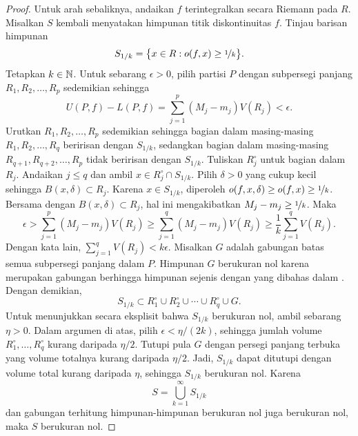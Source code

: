 \begin{proof}
\pagebreak[2]
Untuk arah sebaliknya, andaikan $f$ terintegralkan secara Riemann
pada $R$.
Misalkan $S$ kembali menyatakan himpunan titik diskontinuitas $f$. Tinjau
barisan himpunan
\begin{equation*}
S_{1/k} = \bigl\{ x \in R : o(f,x) \geq \nicefrac{1}{k} \bigr\}.
\end{equation*}
Tetapkan $k \in {\mathbb{N}}$.
Untuk sebarang $\epsilon > 0$, pilih partisi $P$ dengan subpersegi panjang
$R_1,R_2,\ldots,R_p$ sedemikian sehingga
\begin{equation*}
U(P,f)-L(P,f) =
\sum_{j=1}^p (M_j-m_j) V(R_j)
< \epsilon .
\end{equation*}
Urutkan $R_1,R_2,\ldots,R_p$ sedemikian sehingga bagian dalam masing-masing
$R_1,R_2,\ldots,R_{q}$ beririsan dengan $S_{1/k}$, sedangkan bagian dalam
masing-masing $R_{q+1},R_{q+2},\ldots,R_p$ tidak beririsan dengan $S_{1/k}$.
Tuliskan $R_j^\circ$ untuk bagian dalam $R_j$.
Andaikan $j \leq q$ dan ambil
$x \in R_j^\circ \cap S_{1/k}$.
Pilih $\delta > 0$ yang cukup kecil sehingga $B(x,\delta) \subset R_j$.
Karena $x \in S_{1/k}$, diperoleh
$o(f,x,\delta) \geq o(f,x) \geq \nicefrac{1}{k}$.
Bersama dengan $B(x,\delta) \subset R_j$, hal ini mengakibatkan
$M_j-m_j \geq \nicefrac{1}{k}$.
Maka
\begin{equation*}
\epsilon >
\sum_{j=1}^p (M_j-m_j) V(R_j)
\geq
\sum_{j=1}^q (M_j-m_j) V(R_j)
\geq
\frac{1}{k}
\sum_{j=1}^q V(R_j) .
\end{equation*}
Dengan kata lain,
$\sum_{j=1}^q V(R_j) < k \epsilon$.
Misalkan $G$ adalah gabungan batas semua subpersegi panjang dalam $P$.
Himpunan $G$ berukuran nol karena merupakan gabungan berhingga himpunan sejenis
dengan yang dibahas dalam .
Dengan demikian,
\begin{equation*}
S_{1/k} \subset R_1^\circ \cup R_2^\circ \cup \cdots \cup R_q^\circ \cup G .
\end{equation*}
Untuk menunjukkan secara eksplisit bahwa $S_{1/k}$ berukuran nol, ambil
sebarang $\eta>0$. Dalam argumen di atas, pilih
$\epsilon<\eta/(2k)$, sehingga jumlah volume $R_1^\circ,\ldots,R_q^\circ$
kurang daripada $\eta/2$. Tutupi pula $G$ dengan persegi panjang terbuka yang
volume totalnya kurang daripada $\eta/2$. Jadi, $S_{1/k}$ dapat ditutupi dengan
volume total kurang daripada $\eta$, sehingga $S_{1/k}$ berukuran nol. Karena
\begin{equation*}
S = \bigcup_{k=1}^\infty S_{1/k}
\end{equation*}
dan gabungan terhitung himpunan-himpunan berukuran nol juga berukuran nol,
maka $S$ berukuran nol.
\end{proof}

